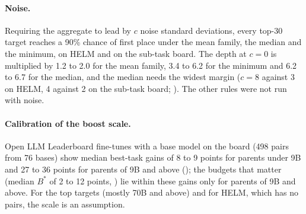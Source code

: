\paragraph{Noise.}
Requiring the aggregate to lead by $c$ noise standard deviations, every top-30 target reaches a 90\% chance of first place under the mean family, the median and the minimum, on HELM and on the sub-task board. The depth at $c=0$ is multiplied by 1.2 to 2.0 for the mean family, 3.4 to 6.2 for the minimum and 6.2 to 6.7 for the median, and the median needs the widest margin ($c=8$ against 3 on HELM, 4 against 2 on the sub-task board; ). The other rules were not run with noise.

\paragraph{Calibration of the boost scale.}\label{sec:calibration}
Open LLM Leaderboard fine-tunes with a base model on the board (498 pairs from 76 bases) show median best-task gains of 8 to 9 points for parents under 9B and 27 to 36 points for parents of 9B and above (); the budgets that matter (median $B^\ast$ of 2 to 12 points, ) lie within these gains only for parents of 9B and above. For the top targets (mostly 70B and above) and for HELM, which has no pairs, the scale is an assumption.

\begin{table}[t]
\centering
\caption{Pre-registered tests and verdicts, each against the direction predicted (S, P, F: supported, partial, failed). HELM-57 has $m=57$ subjects; OLLB-6 and OLLB-39 are the Open LLM Leaderboard at benchmark ($m=6$) and sub-task ($m=39$) level. The last three rows are exploratory and post hoc.}
\label{tab:verdicts}

\end{table}
